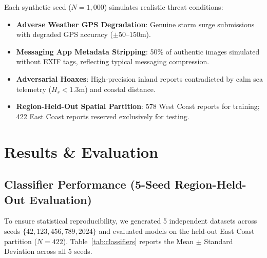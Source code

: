 \documentclass[conference]{IEEEtran}
\begin{document}
Each synthetic seed ($N=1,000$) simulates realistic threat conditions:
\begin{itemize}
    \item \textbf{Adverse Weather GPS Degradation}: Genuine storm surge submissions with degraded GPS accuracy ($\pm 50\text{--}150\text{m}$).
    \item \textbf{Messaging App Metadata Stripping}: 50\% of authentic images simulated without EXIF tags, reflecting typical messaging compression.
    \item \textbf{Adversarial Hoaxes}: High-precision inland reports contradicted by calm sea telemetry ($H_s < 1.3\text{m}$) and coastal distance.
    \item \textbf{Region-Held-Out Spatial Partition}: 578 West Coast reports for training; 422 East Coast reports reserved exclusively for testing.
\end{itemize}

\section{Results \& Evaluation}

\subsection{Classifier Performance (5-Seed Region-Held-Out Evaluation)}
To ensure statistical reproducibility, we generated 5 independent datasets across seeds $\{42, 123, 456, 789, 2024\}$ and evaluated models on the held-out East Coast partition ($N=422$). Table~\ref{tab:classifiers} reports the Mean $\pm$ Standard Deviation across all 5 seeds.

\begin{table}[t]
\centering
\caption{Classifier Performance on Region-Held-Out Spatial Test Set (Mean $\pm$ Std across 5 Independent Seeds, $N=422$)}
\label{tab:classifiers}
\end{table}
\end{document}
